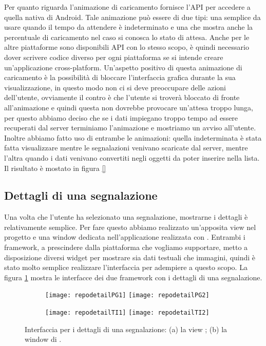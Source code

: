 			\noindent Per quanto riguarda l'animazione di caricamento \tisdk{} fornisce 
			l'API per accedere a quella nativa di Android. 
			Tale animazione può essere di due tipi: una semplice da usare quando 
			il tempo da attendere è indeterminato e 
			una che mostra anche la percentuale di caricamento nel caso si conosca 
			lo stato di attesa.
			Anche per le altre piattaforme sono disponibili API con lo stesso scopo, 
			è quindi necessario dover scrivere codice diverso per ogni piattaforma 
			se si intende creare un'applicazione cross-platform.
			Un'aspetto positivo di questa animazione di caricamento è la possibilità 
			di bloccare l'interfaccia grafica durante la sua visualizzazione, 
			in questo modo non ci si deve preoccupare delle azioni dell'utente, 
			ovviamente il contro è che l'utente si troverà bloccato di fronte 
			all'animazione e quindi questa non dovrebbe provocare un'attesa troppo 
			lunga, per questo abbiamo deciso che se i dati impiegano troppo tempo 
			ad essere recuperati dal server terminiamo l'animazione e mostriamo 
			un avviso all'utente. Inoltre abbiamo fatto uso di entrambe le animazioni: 
			quella indeterminata è stata fatta visualizzare mentre le segnalazioni 
			venivano scaricate dal server, mentre l'altra quando i dati venivano 
			convertiti negli oggetti da poter inserire nella lista. Il risultato 
			è mostato in figura \ref{}
			 
		\subsection{Dettagli di una segnalazione}
		\label{subsec:dattagli}
			Una volta che l'utente ha selezionato una segnalazione, mostrarne i 
			dettagli è relativamente semplice. Per fare questo abbiamo 
			realizzato un'apposita view \kendomob{} nel progetto \pg{} e una 
			window dedicata nell'applicazione realizzata con \tisdk{}. Entrambi i 
			framework, a prescindere dalla piattaforma che vogliamo supportare, 
			metto a disposizione diversi widget per mostrare sia dati testuali 
			che immagini, quindi è stato molto semplice realizzare l'interfaccia 
			per adempiere a questo scopo. La figura \ref{fig:repodetails}
			mostra le interfacce dei due framework con i dettagli di una
			segnalazione.
			\begin{figure}[h]
				\centering
				\begin{subfigure}[b]{0.9\textwidth}
					\texttt{[image: repodetailPG1]}
					\texttt{[image: repodetailPG2]}
					\caption{}
				\end{subfigure}
				\begin{subfigure}[b]{0.9\textwidth}
					\texttt{[image: repodetailTI1]}
					\texttt{[image: repodetailTI2]}
					\caption{}
				\end{subfigure}
				\caption{
					Interfaccia per i dettagli di una segnalazione: (a) la view
					\kendomob{}; (b) la window di \tisdk{}.
				}
				\label{fig:repodetails}
			\end{figure}
			
